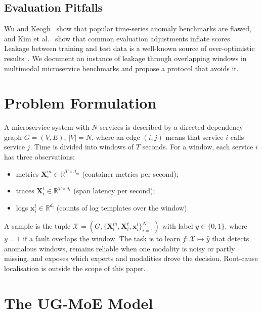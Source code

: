 \documentclass[journal]{IEEEtran}
\begin{document}
\subsection{Evaluation Pitfalls}
Wu and Keogh~\cite{wu2023flawed} show that popular time-series anomaly benchmarks are flawed, and Kim et
al.~\cite{kim2022rigorous} show that common evaluation adjustments inflate scores. Leakage between training
and test data is a well-known source of over-optimistic results~\cite{kaufman2012leakage,kapoor2023leakage}.
We document an instance of leakage through overlapping windows in multimodal microservice benchmarks and
propose a protocol that avoids it.

\section{Problem Formulation}
\label{sec:problem}

A microservice system with $N$ services is described by a directed dependency graph $G=(V,E)$, $|V|=N$,
where an edge $(i,j)$ means that service $i$ calls service $j$. Time is divided into windows of $T$ seconds.
For a window, each service $i$ has three observations:
\begin{itemize}
  \item metrics $\bm{X}^{m}_i\in\mathbb{R}^{T\times d_m}$ (container metrics per second);
  \item traces $\bm{X}^{t}_i\in\mathbb{R}^{T\times d_t}$ (span latency per second);
  \item logs $\bm{x}^{l}_i\in\mathbb{R}^{d_l}$ (counts of log templates over the window).
\end{itemize}
A sample is the tuple $\mathcal{X}=(G,\{\bm{X}^m_i,\bm{X}^t_i,\bm{x}^l_i\}_{i=1}^{N})$ with label
$y\in\{0,1\}$, where $y=1$ if a fault overlaps the window. The task is to learn
$f:\mathcal{X}\mapsto\hat{y}$ that detects anomalous windows, remains reliable when one modality is noisy
or partly missing, and exposes which experts and modalities drove the decision. Root-cause localisation is
outside the scope of this paper.

\section{The UG-MoE Model}
\label{sec:method}
\end{document}
